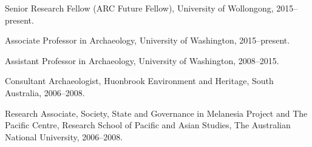 
\ind Senior Research Fellow (ARC Future Fellow),  University of Wollongong, 2015--present.     

\ind Associate Professor in Archaeology,  University of Washington, 2015--present.     

\ind Assistant Professor in Archaeology,  University of Washington, 2008--2015.     

\ind Consultant Archaeologist, Huonbrook Environment and Heritage, South Australia, 2006--2008.

\ind Research Associate, Society, State and Governance in Melanesia Project and The Pacific Centre, Research School of Pacific and Asian Studies, The Australian National University, 2006--2008.